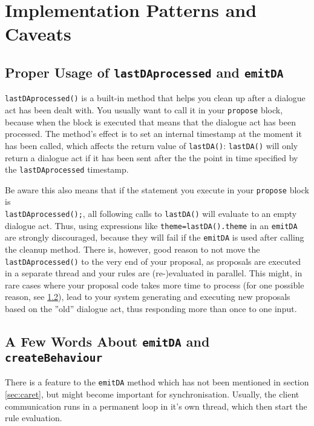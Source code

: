 \section{Implementation Patterns and Caveats}

\subsection{Proper Usage of \texttt{lastDAprocessed} and \texttt{emitDA}}
\label{sec:lastDAprocessed}

\texttt{lastDAprocessed()} is a built-in method that helps you clean
up after a dialogue act has been dealt with. You usually want to call
it in your \texttt{propose} block, because when the block is executed
that means that the dialogue act has been processed. The method's
effect is to set an internal timestamp at the moment it has been
called, which affects the return value of \texttt{lastDA()}:
\texttt{lastDA()} will only return a dialogue act if it has been sent
after the the point in time specified by the \texttt{lastDAprocessed}
timestamp.

Be aware this also means that if the statement you execute in your
\texttt{propose} block is\\ \texttt{lastDAprocessed();}, all following
calls to \texttt{lastDA()} will evaluate to an empty dialogue
act. Thus, using expressions like \texttt{theme=lastDA().theme} in an
\texttt{emitDA} are strongly discouraged, because they will fail if
the \texttt{emitDA} is used after calling the cleanup method. There
is, however, good reason to not move the \texttt{lastDAprocessed()} to
the very end of your proposal, as proposals are executed in a separate
thread and your \vonda rules are (re-)evaluated in parallel. This
might, in rare cases where your proposal code takes more time to
process (for one possible reason, see \ref{sec:emitDA}), lead to your
system generating and executing new proposals based on the ''old''
dialogue act, thus responding more than once to one input.

\subsection{A Few Words About \texttt{emitDA} and \texttt{createBehaviour}} \label{sec:emitDA}

There is a feature to the \texttt{emitDA} method which has not been
mentioned in section \ref{sec:caret}, but might become important for
synchronisation. Usually, the client communication runs in a permanent
loop in it's own thread, which then start the rule evaluation.

